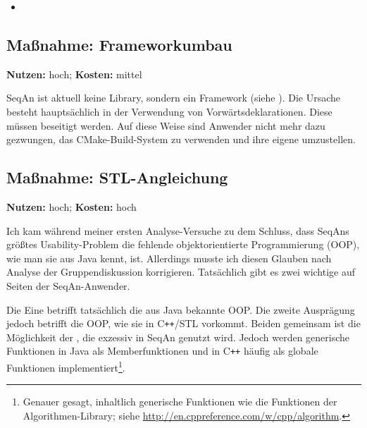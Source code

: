 \begin{itemize}
  \item[\codebullet{apiua://code/-9223372036854775396}] \textbf{}
\end{itemize}






\subsection{Maßnahme: Frameworkumbau}
\textbf{Nutzen:} hoch; \textbf{Kosten:} mittel

SeqAn ist aktuell keine Library, sondern ein Framework (siehe ). Die Ursache besteht hauptsächlich in der Verwendung von Vorwärtsdeklarationen. Diese müssen beseitigt werden. Auf diese Weise sind Anwender nicht mehr dazu gezwungen, das CMake-Build-System zu verwenden und ihre eigene  umzustellen.




\subsection{Maßnahme: STL-Angleichung}
\textbf{Nutzen:} hoch; \textbf{Kosten:} hoch

Ich kam während meiner ersten Analyse-Versuche zu dem Schluss, dass SeqAns größtes Usability-Problem die fehlende objektorientierte Programmierung (OOP), wie man sie aus Java kennt, ist. Allerdings musste ich diesen Glauben nach Analyse der Gruppendiskussion korrigieren. Tatsächlich gibt es zwei wichtige  auf Seiten der SeqAn-Anwender.

Die Eine betrifft tatsächlich die aus Java bekannte OOP. Die zweite Ausprägung jedoch betrifft die OOP, wie sie in C\texttt{++}/STL vorkommt. Beiden gemeinsam ist die Möglichkeit der , die exzessiv in SeqAn genutzt wird. Jedoch werden generische Funktionen in Java als Memberfunktionen und in C\texttt{++} häufig als globale Funktionen implementiert\footnote{Genauer gesagt, inhaltlich generische Funktionen wie die Funktionen der Algorithmen-Library; siehe \url{http://en.cppreference.com/w/cpp/algorithm}.}. 

